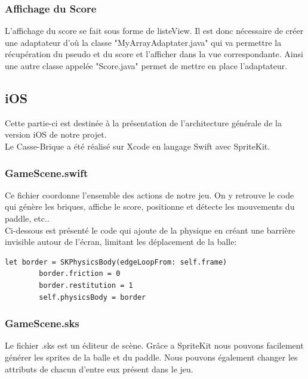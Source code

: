 \documentclass[a4paper]{article}
\begin{document}
\subsubsection{Affichage du Score}
L'affichage du score se fait sous forme de listeView. Il est donc nécessaire de créer une adaptateur d'où la classe "MyArrayAdaptater.java" qui va permettre la récupération du pseudo et du score et l'afficher dans la vue correspondante. Ainsi une autre classe appelée "Score.java" permet de mettre en place l'adaptateur.

\newpage
\subsection{iOS}
Cette partie-ci est destinée à la présentation de l'architecture générale de la version iOS de notre projet.\\
Le Casse-Brique a été réalisé sur Xcode en langage Swift avec SpriteKit.

\subsubsection{GameScene.swift}
Ce fichier coordonne l'ensemble des actions de notre jeu. On y retrouve le code qui génère les briques, affiche le score, positionne et détecte les mouvements du paddle, etc..\\
Ci-dessous est présenté le code qui ajoute de la physique en créant une barrière invisible autour de l’écran, limitant les déplacement de la balle:
\begin{verbatim}
let border = SKPhysicsBody(edgeLoopFrom: self.frame)
        border.friction = 0
        border.restitution = 1
        self.physicsBody = border
\end{verbatim}

\subsubsection{GameScene.sks}
Le fichier .sks est un éditeur de scène. Grâce a SpriteKit nous pouvons facilement générer les sprites de la balle et du paddle. Nous pouvons également changer les attributs de chacun d'entre eux présent dans le jeu. 
\end{document}
